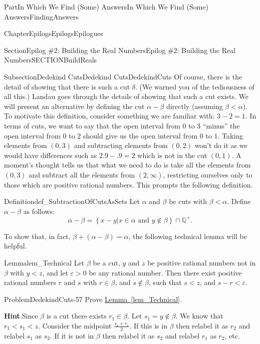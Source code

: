 \documentclass[oneside,10pt,]{book}
\newcommand{\blocktitlefont}{\relax}
\newcommand{\xreffont}{\relax}
\numberwithin{equation}{part}
\newcommand{\eps}{\varepsilon}
\newcommand{\QQ}{\mathbb {Q}}
\newcommand{\lt}{<}
\begin{document}
\begin{partptx}{Part}{In Which We Find (Some) Answers}{}{In Which We Find (Some) Answers}{}{}{FindingAnswers}
\begin{chapterptx}{Chapter}{Epilogs}{}{Epilogs}{}{}{Epilogues}
\begin{sectionptx}{Section}{Epilog \#2: Building the Real Numbers}{}{Epilog \#2: Building the Real Numbers}{}{}{SECTIONBuildReals}
\begin{subsectionptx}{Subsection}{Dedekind Cuts}{}{Dedekind Cuts}{}{}{DedekindCuts}
Of course, there is the detail of showing that there is such a cut \(\delta\).  (We warned you of the tediousness of all this.) Landau goes through the details of showing that such a cut exists. We will present an alternative by defining the cut \(\alpha-\beta\) directly (assuming \(\beta\lt \alpha\)).  To motivate this definition, consider something we are familiar with: \(3-2=1\).  In terms of cuts, we want to say that the open interval from \(0\) to \(3\) ``minus'' the open interval from \(0\) to \(2\) should give us the open interval from \(0\) to \(1\).  Taking elements from \((0,3)\) and subtracting elements from \((0,2)\) won't do it as we would have differences such as \(2.9-.9=2\) which is not in the cut \((0,1)\).  A moment's thought tells us that what we need to do is take all the elements from \((0,3)\) and subtract all the elements from \((2,\infty)\), restricting ourselves only to those which are positive rational numbers.  This prompts the following definition.%
\begin{definition}{Definition}{}{def_SubtractionOfCutsAsSets}%
%
%
Let \(\alpha\) and \(\beta\) be cuts with \(\beta\lt \alpha\).  Define \(\alpha-\beta\) as follows:%
\begin{equation*}
\alpha-\beta =\left\{x-y|x\in\alpha \text{ and } y\not\in\beta\right\}\cap\QQ^+\text{.}
\end{equation*}
%
\end{definition}
To show that, in fact, \(\beta+(\alpha-\beta)=\alpha\), the following technical lemma will be helpful.%
\begin{lemma}{Lemma}{}{}{lem_Technical}%
Let \(\beta\) be a cut, \(y\) and \(z\) be positive rational numbers not in \(\beta\) with \(y\lt z\), and let \(\eps>0\) be any rational number.  Then there exist positive rational numbers \(r\) and \(s\) with \(r\in\beta\), and \(s\not\in\beta\), such that \(s\lt z\), and \(s-r\lt \eps\).%
\end{lemma}
\begin{problem}{Problem}{}{DedekindCuts-57}%
Prove \hyperref[lem_Technical]{Lemma~{\xreffont\ref{lem_Technical}}}.%
\par\smallskip%
\noindent\textbf{\blocktitlefont Hint}.\hypertarget{DedekindCuts-57-3}{}\quad{}Since \(\beta\) is a cut there exists \(r_1\in\beta\). Let \(s_1=y\not\in\beta\).  We know that \(r_1\lt s_1\lt
z\).  Consider the midpoint \(\frac{s_1+r_1}{2}\).  If this is in \(\beta\) then relabel it as \(r_2\) and relabel \(s_1\) as \(s_2\).  If it is not in \(\beta\) then relabel it as \(s_2\) and relabel \(r_1\) as \(r_2\), etc.%

\end{problem}
\end{subsectionptx}
\end{sectionptx}
\end{chapterptx}
\end{partptx}
\end{document}
